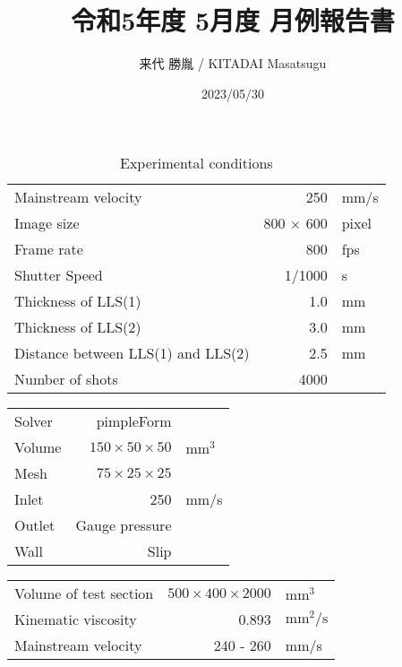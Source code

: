 \documentclass[a4j]{jsarticle}
\author{来代 勝胤 / KITADAI Masatsugu}
\title{令和5年度 5月度 月例報告書}
\date{2023/05/30}
\begin{document}
\columnseprule=0.1mm
\maketitle

\begin{table}[h]
  \label{table:data_type}
  \centering
  \caption{Experimental conditions}
  \begin{tabular}{l r l}
    \hline
    Mainstream velocity                & 250              & mm/s  \\
    Image size                         & 800 $\times$ 600 & pixel \\
    Frame rate                         & 800              & fps   \\
    Shutter Speed                      & 1/1000           & s     \\
    Thickness of LLS(1)                & 1.0              & mm    \\
    Thickness of LLS(2)                & 3.0              & mm    \\
    Distance between LLS(1) and LLS(2) & 2.5              & mm    \\
    Number of shots                    & 4000             &       \\ \hline
  \end{tabular}
\end{table}

\begin{table}[h]
  \label{table:data_type}
  \centering
  \begin{tabular}{l r l}
    \hline
    Solver & pimpleForm                &                 \\
    Volume & $150 \times 50 \times 50$ & $\mathrm{mm}^3$ \\
    Mesh   & $75 \times 25 \times 25$  &                 \\
    Inlet  & 250                       & mm/s            \\
    Outlet & Gauge pressure            &                 \\
    Wall   & Slip                      &                 \\\hline
  \end{tabular}
\end{table}

\begin{table}[h]
  \label{table:data_type}
  \centering
  \begin{tabular}{l r l}
    \hline
    Volume of test section & $500 \times 400 \times 2000$ & $\mathrm{mm}^3$              \\
    Kinematic viscosity    & 0.893                        & $\mathrm{mm}^2 / \mathrm{s}$ \\
    Mainstream velocity    & 240 - 260                    & mm/s                         \\ \hline
  \end{tabular}
\end{table}
\end{document}
